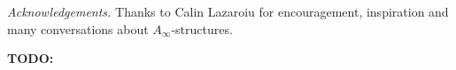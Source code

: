 \documentclass[english,letter paper,12pt,leqno]{article}
\theoremstyle{example}
\numberwithin{equation}{section}
\begin{document}



\vspace{0.3cm}

\emph{Acknowledgements.} Thanks to Calin Lazaroiu for encouragement, inspiration and many conversations about $A_\infty$-structures.

\vspace{0.3cm}

\textbf{TODO:}
\end{document}
